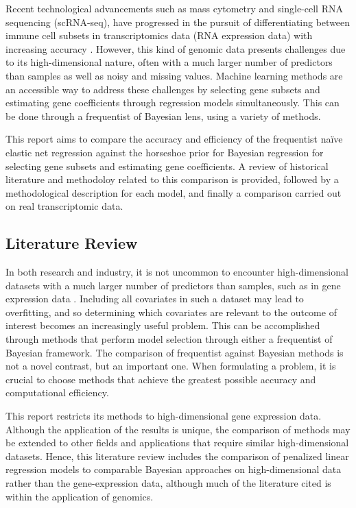 \documentclass[
	a4paper, %
	10pt, %
	unnumberedsections, %
	twoside, %
]{LTJournalArticle}
\newcommand{\1}{\mathbbm{1}}
\begin{document}
Recent technological advancements such as mass cytometry and single-cell RNA sequencing (scRNA-seq), have progressed in the pursuit of differentiating between immune cell subsets in transcriptomics data (RNA expression data) with increasing accuracy \cite{Lin2022}. However, this kind of genomic data  presents challenges due to its high-dimensional nature, often with a much larger number of predictors than samples as well as noisy and missing values. Machine learning methods are an accessible way to address these challenges by selecting gene subsets and estimating gene coefficients through regression models simultaneously. This can be done through a frequentist of Bayesian lens, using a variety of methods. 

This report aims to compare the accuracy and efficiency of the frequentist naïve elastic net regression against the horseshoe prior for Bayesian regression for selecting gene subsets and estimating gene coefficients. A review of historical literature and methodoloy related to this comparison is provided, followed by a methodological description for each model, and finally a comparison carried out on real transcriptomic data. 




\subsection{Literature Review}

In both research and industry, it is not uncommon to encounter high-dimensional datasets with a much larger number of predictors than samples, such as in gene expression data \cite{Narisetty2020}. Including all covariates in such a dataset may lead to overfitting, and so determining which covariates are relevant to the outcome of interest becomes an increasingly useful problem. This can be accomplished through methods that perform model selection through either a frequentist of Bayesian framework. The comparison of frequentist against Bayesian methods is not a novel contrast, but an important one. When formulating a problem, it is crucial to choose methods that achieve the greatest possible accuracy and computational efficiency. 

This report restricts its methods to high-dimensional gene expression data. Although the application of the results is unique, the comparison of methods may be extended to other fields and applications that require similar high-dimensional datasets. Hence, this literature review includes the comparison of penalized linear regression models to comparable Bayesian approaches on high-dimensional data rather than the gene-expression data, although much of the literature cited is within the application of genomics.
\end{document}
